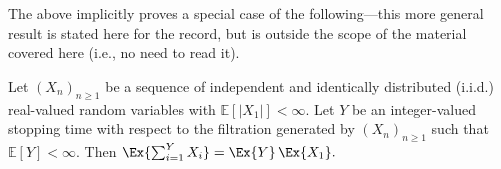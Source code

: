 The above implicitly proves a special case of the following---this more
general result is stated here for the record, but is outside the scope of
the material covered here (i.e., no need to read it).

\begin{theorem}
    Let $(X_n)_{n \ge 1}$ be a sequence of independent and identically
    distributed (i.i.d.) real-valued random variables with
    $\mathbb{E}[|X_1|] < \infty$. Let $Y$ be an integer-valued stopping time
    with respect to the filtration generated by $(X_n)_{n \ge 1}$ such that
    $\mathbb{E}[Y] < \infty$.  Then
    \begin{math}
        \Ex{ \sum_{i=1}^{Y} X_i } = \Ex{Y} \,
        \Ex{X_1}.
    \end{math}
\end{theorem}







\ChapterEnd{}





